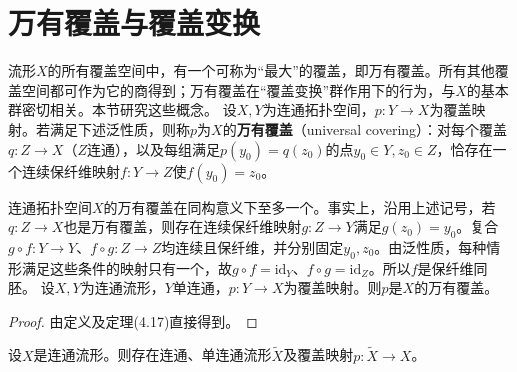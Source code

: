 \section{万有覆盖与覆盖变换}
流形$X$的所有覆盖空间中，有一个可称为“最大”的覆盖，即万有覆盖。所有其他覆盖空间都可作为它的商得到；万有覆盖在“覆盖变换”群作用下的行为，与$X$的基本群密切相关。本节研究这些概念。
设$X,Y$为连通拓扑空间，$p:Y\to X$为覆盖映射。若满足下述泛性质，则称$p$为$X$的\textbf{万有覆盖}（universal covering）：对每个覆盖$q:Z\to X$（$Z$连通），以及每组满足$p(y_0)=q(z_0)$的点$y_0\in Y,z_0\in Z$，恰存在一个连续保纤维映射$f:Y\to Z$使$f(y_0)=z_0$。

连通拓扑空间$X$的万有覆盖在同构意义下至多一个。事实上，沿用上述记号，若$q:Z\to X$也是万有覆盖，则存在连续保纤维映射$g:Z\to Y$满足$g(z_0)=y_0$。复合$g\circ f:Y\to Y$、$f\circ g:Z\to Z$均连续且保纤维，并分别固定$y_0,z_0$。由泛性质，每种情形满足这些条件的映射只有一个，故$g\circ f=\mathrm{id}_Y$、$f\circ g=\mathrm{id}_Z$。所以$f$是保纤维同胚。
设$X,Y$为连通流形，$Y$单连通，$p:Y\to X$为覆盖映射。则$p$是$X$的万有覆盖。
\begin{proof}由定义及定理(4.17)直接得到。\end{proof}
设$X$是连通流形。则存在连通、单连通流形$\widetilde X$及覆盖映射$p:\widetilde X\to X$。

